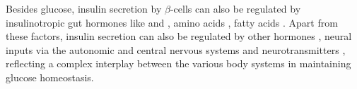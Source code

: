 \par Besides glucose, insulin secretion by $\beta$-cells can also be regulated by insulinotropic gut hormones like  \textbf{\cite{meloni_glp-1_2013,carlessi_glp-1_2017,macdonald_multiple_2002}} and  \textbf{\cite{seino_gip_2010,christensen_glucose-dependent_2011,irwin_therapeutic_2009}}, amino acids \textbf{\cite{newsholme_amino_2006,newsholme_nutritional_2012}}, fatty acids \textbf{\cite{poitout_fatty_2018,cen_fatty_2016,jezek_fatty_2018,chueire_effect_2020}}. Apart from these factors, insulin secretion can also be regulated by other hormones \textbf{\cite{cheng_follicle-stimulating_2023}}, neural inputs via the autonomic \textbf{\cite{thorens_brain_2011, komatsu_glucosestimulated_2013}} and central nervous systems \textbf{\cite{ruud_neuronal_2017}} and neurotransmitters \textbf{\cite{rodriguez-diaz_neurotransmitters_2014}}, reflecting a complex interplay between the various body systems in maintaining glucose homeostasis. 



